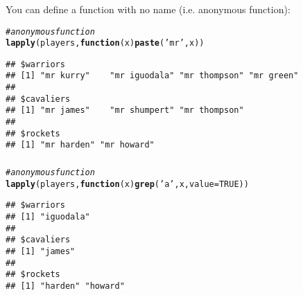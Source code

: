\documentclass[12pt]{beamer}\usepackage[]{graphicx}\usepackage[]{color}
\makeatletter
\newcommand{\hlnum}[1]{\textcolor[rgb]{0.686,0.059,0.569}{#1}}%
\newcommand{\hlstr}[1]{\textcolor[rgb]{0.192,0.494,0.8}{#1}}%
\newcommand{\hlcom}[1]{\textcolor[rgb]{0.678,0.584,0.686}{\textit{#1}}}%
\newcommand{\hlstd}[1]{\textcolor[rgb]{0.345,0.345,0.345}{#1}}%
\newcommand{\hlkwa}[1]{\textcolor[rgb]{0.161,0.373,0.58}{\textbf{#1}}}%
\newcommand{\hlkwc}[1]{\textcolor[rgb]{0.333,0.667,0.333}{#1}}%
\newcommand{\hlkwd}[1]{\textcolor[rgb]{0.737,0.353,0.396}{\textbf{#1}}}%
\newenvironment{kframe}{%
 \def\at@end@of@kframe{}%
 \ifinner\ifhmode%
  \def\at@end@of@kframe{\end{minipage}}%
  \begin{minipage}{\columnwidth}%
 \fi\fi%
 \def\FrameCommand##1{\hskip\@totalleftmargin \hskip-\fboxsep
 \colorbox{shadecolor}{##1}\hskip-\fboxsep
     \hskip-\linewidth \hskip-\@totalleftmargin \hskip\columnwidth}%
 \MakeFramed {\advance\hsize-\width
   \@totalleftmargin\z@ \linewidth\hsize
   \@setminipage}}%
 {\par\unskip\endMakeFramed%
 \at@end@of@kframe}
\newenvironment{knitrout}{}{} %
\makeatother
\begin{document}

\begin{frame}[fragile]
\frametitle{}

You can define a function with no name (i.e. anonymous function):
\begin{knitrout}\footnotesize
{}\color{fgcolor}\begin{kframe}
\begin{alltt}
\hlcom{# anonymous function}
\hlkwd{lapply}\hlstd{(players,} \hlkwa{function}\hlstd{(}\hlkwc{x}\hlstd{)} \hlkwd{paste}\hlstd{(}\hlstr{'mr'}\hlstd{, x))}
\end{alltt}
\begin{verbatim}
## $warriors
## [1] "mr kurry"    "mr iguodala" "mr thompson" "mr green"   
## 
## $cavaliers
## [1] "mr james"    "mr shumpert" "mr thompson"
## 
## $rockets
## [1] "mr harden" "mr howard"
\end{verbatim}
\end{kframe}
\end{knitrout}

\end{frame}


\begin{frame}[fragile]
\frametitle{}

\begin{knitrout}\footnotesize
{}\color{fgcolor}\begin{kframe}
\begin{alltt}
\hlcom{# anonymous function}
\hlkwd{lapply}\hlstd{(players,} \hlkwa{function}\hlstd{(}\hlkwc{x}\hlstd{)} \hlkwd{grep}\hlstd{(}\hlstr{'a'}\hlstd{, x,} \hlkwc{value} \hlstd{=} \hlnum{TRUE}\hlstd{))}
\end{alltt}
\begin{verbatim}
## $warriors
## [1] "iguodala"
## 
## $cavaliers
## [1] "james"
## 
## $rockets
## [1] "harden" "howard"
\end{verbatim}
\end{kframe}
\end{knitrout}

\end{frame}

\end{document}
